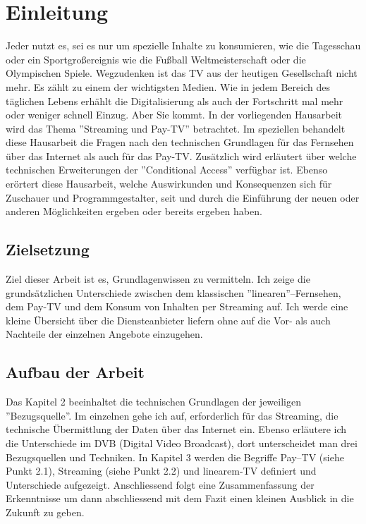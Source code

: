 \section{Einleitung}
Jeder nutzt es, sei es nur um spezielle Inhalte zu konsumieren, wie die Tagesschau oder ein Sportgroßereignis wie die Fußball Weltmeisterschaft oder die Olympischen Spiele.
Wegzudenken ist das TV aus der heutigen Gesellschaft nicht mehr. Es zählt zu einem der wichtigsten Medien.
Wie in jedem Bereich des täglichen Lebens erhählt die Digitalisierung als auch der Fortschritt mal mehr oder weniger schnell Einzug. Aber Sie kommt. In der vorliegenden Hausarbeit wird das Thema
''Streaming und Pay-TV'' betrachtet. \newline
Im speziellen behandelt diese Hausarbeit die Fragen nach den technischen Grundlagen für das Fernsehen über das Internet als auch für das Pay-TV.
Zusätzlich wird erläutert über welche technischen Erweiterungen der ''Conditional Access'' verfügbar ist.
Ebenso erörtert diese Hausarbeit, welche Auswirkunden und Konsequenzen sich für Zuschauer und Programmgestalter, seit und durch die Einführung der neuen oder anderen Möglichkeiten ergeben oder bereits ergeben haben.

\subsection{Zielsetzung}
Ziel dieser Arbeit ist es, Grundlagenwissen zu vermitteln. Ich zeige die grundsätzlichen Unterschiede zwischen dem klassischen ''linearen''--Fernsehen, dem Pay-TV und dem Konsum von Inhalten per Streaming auf.
Ich werde eine kleine Übersicht über die Diensteanbieter liefern ohne auf die Vor- als auch Nachteile der einzelnen Angebote einzugehen.


\subsection{Aufbau der Arbeit}
Das Kapitel 2 beeinhaltet die technischen Grundlagen der jeweiligen ''Bezugsquelle''. Im einzelnen gehe ich auf, erforderlich für das Streaming, die technische Übermittlung der Daten über das Internet ein. Ebenso erläutere ich die Unterschiede im DVB (Digital Video Broadcast), dort unterscheidet man drei Bezugsquellen und Techniken.
In Kapitel 3 werden die Begriffe Pay--TV (siehe Punkt 2.1), Streaming (siehe Punkt 2.2) und linearem-TV definiert und Unterschiede aufgezeigt.
Anschliessend folgt eine Zusammenfassung der Erkenntnisse um dann abschliessend mit dem Fazit einen kleinen Ausblick in die Zukunft zu geben. 









